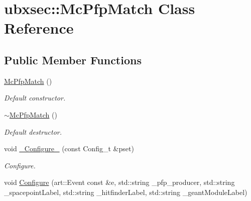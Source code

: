 \hypertarget{classubxsec_1_1McPfpMatch}{\section{ubxsec\-:\-:Mc\-Pfp\-Match Class Reference}
\label{classubxsec_1_1McPfpMatch}
}
\subsection*{Public Member Functions}
\begin{DoxyCompactItemize}
\item 
\hypertarget{classubxsec_1_1McPfpMatch_aea3e9923fdf8855d5798015b36f2d516}{\hyperlink{classubxsec_1_1McPfpMatch_aea3e9923fdf8855d5798015b36f2d516}{Mc\-Pfp\-Match} ()}\label{classubxsec_1_1McPfpMatch_aea3e9923fdf8855d5798015b36f2d516}

\begin{DoxyCompactList}\small\item\em Default constructor. \end{DoxyCompactList}\item 
\hypertarget{classubxsec_1_1McPfpMatch_a3fa822d7321aca21a0ad42e692a29bf2}{\hyperlink{classubxsec_1_1McPfpMatch_a3fa822d7321aca21a0ad42e692a29bf2}{$\sim$\-Mc\-Pfp\-Match} ()}\label{classubxsec_1_1McPfpMatch_a3fa822d7321aca21a0ad42e692a29bf2}

\begin{DoxyCompactList}\small\item\em Default destructor. \end{DoxyCompactList}\item 
\hypertarget{classubxsec_1_1McPfpMatch_aa6578a20f7a8194fae3caa2b19044e40}{void \hyperlink{classubxsec_1_1McPfpMatch_aa6578a20f7a8194fae3caa2b19044e40}{\-\_\-\-Configure\-\_\-} (const Config\-\_\-t \&pset)}\label{classubxsec_1_1McPfpMatch_aa6578a20f7a8194fae3caa2b19044e40}

\begin{DoxyCompactList}\small\item\em Configure. \end{DoxyCompactList}\item 
\hypertarget{classubxsec_1_1McPfpMatch_a15cea806e5a1b12bf2e187d5d26c528d}{void \hyperlink{classubxsec_1_1McPfpMatch_a15cea806e5a1b12bf2e187d5d26c528d}{Configure} (art\-::\-Event const \&e, std\-::string \-\_\-pfp\-\_\-producer, std\-::string \-\_\-spacepoint\-Label, std\-::string \-\_\-hitfinder\-Label, std\-::string \-\_\-geant\-Module\-Label)}\label{classubxsec_1_1McPfpMatch_a15cea806e5a1b12bf2e187d5d26c528d}


\end{DoxyCompactItemize}
